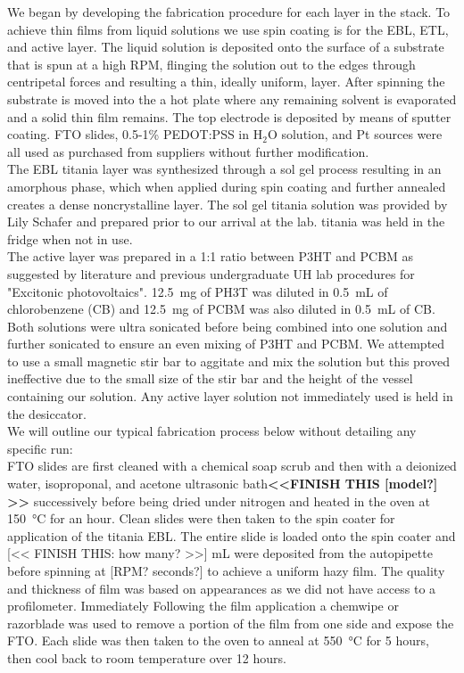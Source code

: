 We began by developing the fabrication procedure for each layer in the stack. To achieve thin films from liquid solutions we use spin coating is for the EBL, ETL, and active layer. The liquid solution is deposited onto the surface of a substrate that is spun at a high RPM, flinging the solution out to the edges through centripetal forces and resulting a thin, ideally uniform, layer. After spinning the substrate is moved into the a hot plate where any remaining solvent is evaporated and a solid thin film remains. The top electrode is deposited by means of sputter coating. FTO slides, 0.5-1\% PEDOT:PSS in H$_2$O solution, and Pt sources were all used as purchased from suppliers without further modification. \\
	
	The EBL titania layer was synthesized through a sol gel process resulting in an amorphous phase, which when applied during spin coating and further annealed creates a dense noncrystalline layer. The sol gel titania solution was provided by Lily Schafer and prepared prior to our arrival at the lab. titania was held in the fridge when not in use.\\
	
	The active layer was prepared in a 1:1 ratio between P3HT and PCBM as suggested by literature and previous undergraduate UH lab procedures for "Excitonic photovoltaics". \SI{12.5}{\milli\gram} of PH3T was diluted in \SI{0.5}{\milli\liter} of chlorobenzene (CB) and \SI{12.5}{\milli\gram} of PCBM was also diluted in \SI{0.5}{\milli\liter} of CB. Both solutions were ultra sonicated before being combined into one solution and further sonicated to ensure an even mixing of P3HT and PCBM. We attempted to use a small magnetic stir bar to aggitate and mix the solution but this proved ineffective due to the small size of the stir bar and the height of the vessel containing our solution. Any active layer solution not immediately used is held in the desiccator. \\
	
	We will outline our typical fabrication process below without detailing any specific run:\\
	
	FTO slides are first cleaned with a chemical soap scrub and then with a deionized water, isoproponal, and acetone ultrasonic bath\textbf{<<FINISH THIS [model?] >>} successively before being dried under nitrogen and heated in the oven at \SI{150}{\celsius} for an hour. Clean slides were then taken to the spin coater for application of the titania EBL. The entire slide is loaded onto the spin coater and [<< FINISH THIS: how many? >>] mL were deposited from the autopipette before spinning at [RPM? seconds?] to achieve a uniform hazy film. The quality and thickness of  film was based on appearances as we did not have access to a profilometer. Immediately Following the film application a chemwipe or razorblade was used to remove a portion of the film from one side and expose the FTO. Each slide was then taken to the oven to anneal at \SI{550}{\celsius} for 5 hours, then cool back to room temperature over 12 hours. \\
	
